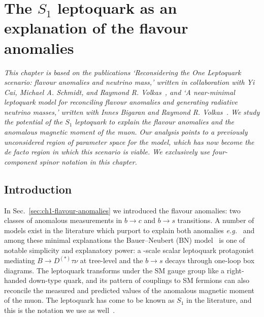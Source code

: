 \graphicspath{{img/chapter_3/}}


\chapter{The $S_{1}$ leptoquark as an explanation of the flavour anomalies}
\label{chapter:the-one-lq}

\begin{flushleft}
  \textit{This chapter is based on the publications `Reconsidering the One
    Leptoquark scenario: flavour anomalies and neutrino mass,' written in
    collaboration with Yi Cai, Michael A. Schmidt, and Raymond R.
    Volkas~\cite{Cai:2017wry}, and `A near-minimal leptoquark model for
    reconciling flavour anomalies and generating radiative neutrino masses,'
    written with Innes Bigaran and Raymond R. Volkas~\cite{Bigaran:2019bqv}. We
    study the potential of the $S_{1}$ leptoquark to explain the flavour
    anomalies and the anomalous magnetic moment of the muon. Our analysis points
    to a previously unconsidered region of parameter space for the model, which
    has now become the de facto region in which this scenario is viable. We
    exclusively use four-component spinor notation in this chapter.}
\end{flushleft}

\section{Introduction}

In Sec.~\ref{sec:ch1-flavour-anomalies} we introduced the flavour anomalies: two
classes of anomalous measurements in $b \to c$ and $b \to s$ transitions. A
number of models exist in the literature which purport to explain both anomalies
\textit{e.g.}~\cite{Alonso:2015sja, Bauer:2015knc, Becirevic:2016oho,
  Becirevic:2016yqi, Boucenna:2016wpr, Boucenna:2016qad, Calibbi:2015kma,
  Crivellin:2017zlb, Deppisch:2016qqd, Deshpand:2016cpw, Fajfer:2015ycq,
  Feruglio:2016gvd, Feruglio:2017rjo, Megias:2017ove,
  Popov:2016fzr,Becirevic:2015asa, Becirevic:2017jtw, Buras:2013qja,
  Freytsis:2015qca, Gauld:2013qba, Glashow:2014iga, Gripaios:2014tna,
  Hiller:2014ula, Hiller:2014yaa, Mahmoudi:2014mja, Megias:2016bde, Pas:2015hca,
  Sahoo:2015fla, Sahoo:2015qha, Sakaki:2013bfa, Sierra:2015fma,
  Varzielas:2015iva, deBoer:2015boa} and among these minimal explanations the
Bauer--Neubert (BN) model~\cite{Bauer:2015knc} is one of notable simplicity and
explanatory power: a \TeV-scale scalar leptoquark protagonist mediating
$B \rightarrow D^{(*)} \tau \nu$ at tree-level and the $b \rightarrow s$ decays
through one-loop box diagrams. The leptoquark transforms under the SM gauge
group like a right-handed down-type quark, and its pattern of couplings to SM
fermions can also reconcile the measured and predicted values of the anomalous
magnetic moment of the muon. The leptoquark has come to be known as $S_{1}$ in
the literature, and this is the notation we use as well~\cite{Dorsner:2016wpm}.

